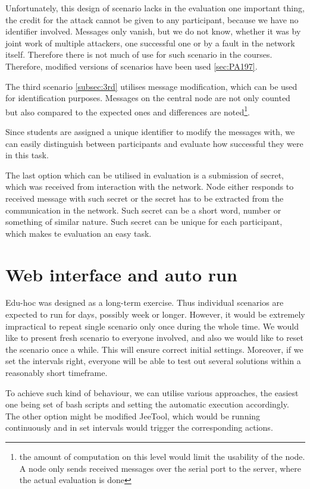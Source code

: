 \documentclass[
  print, %
  Table,   %
  nolof,     %
  nolot,     %
           oneside
]{fithesis3}
\begin{document}
  Unfortunately, this design of scenario lacks in the evaluation one important thing, the credit for the attack cannot be given to any participant, because we have no identifier involved. Messages only vanish, but we do not know, whether it was by joint work of multiple attackers, one successful one or by a fault in the network itself. Therefore there is not much of use for such scenario in the courses. Therefore, modified versions of scenarios have been used \ref{sec:PA197}.

  The third scenario \ref{subsec:3rd} utilises message modification, which can be used for identification purposes. Messages on the central node are not only counted but also compared to the expected ones and differences are noted\footnote{the amount of computation on this level would limit the usability of the node. A node only sends received messages over the serial port to the server, where the actual evaluation is done}.

  Since students are assigned a unique identifier to modify the messages with, we can easily distinguish between participants and evaluate how successful they were in this task.

  The last option which can be utilised in evaluation is a submission of secret, which was received from interaction with the network. Node either responds to received message with such secret or the secret has to be extracted from the communication in the network. Such secret can be a short word, number or something of similar nature. Such secret can be unique for each participant, which makes te evaluation an easy task.

  \section{Web interface and auto run}
  Edu-hoc was designed as a long-term exercise. Thus individual scenarios are expected to run for days, possibly week or longer. However, it would be extremely impractical to repeat single scenario only once during the whole time. We would like to present fresh scenario to everyone involved,  and also we would like to reset the scenario once a while. This will ensure correct initial settings. Moreover, if we set the intervals right, everyone will be able to test out several solutions within a reasonably short timeframe.

  To achieve such kind of behaviour, we can utilise various approaches, the easiest one being set of bash scripts and setting the automatic execution accordingly. The other option might be modified JeeTool, which would be running continuously and in set intervals would trigger the corresponding actions.
\end{document}
